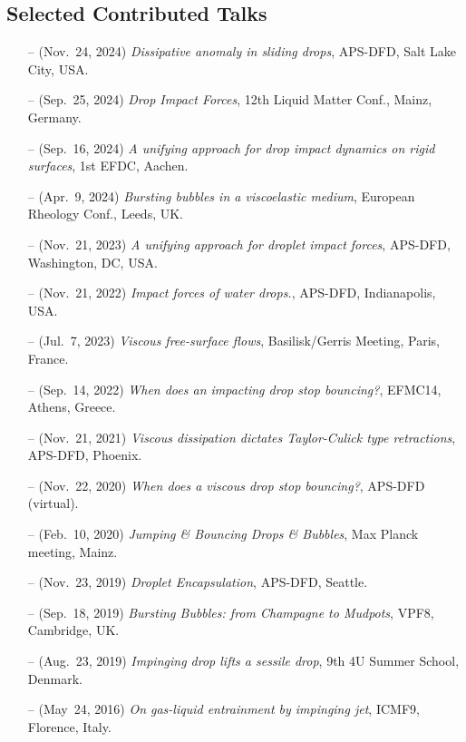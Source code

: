 \documentclass[10pt,a4paper,colorlinks,linkcolor=blue,urlcolor=blue,citecolor=blue]{moderncv}
\begin{document}
\subsection{Selected Contributed Talks}
\begin{itemize}[leftmargin=1.25em]
\item[--] (Nov.~24, 2024) \emph{Dissipative anomaly in sliding drops}, APS-DFD, Salt Lake City, USA.
\item[--] (Sep.~25, 2024) \emph{Drop Impact Forces}, 12th Liquid Matter Conf., Mainz, Germany.
\item[--] (Sep.~16, 2024) \emph{A unifying approach for drop impact dynamics on rigid surfaces}, 1st EFDC, Aachen.
\item[--] (Apr.~9, 2024) \emph{Bursting bubbles in a viscoelastic medium}, European Rheology Conf., Leeds, UK.
\item[--] (Nov.~21, 2023) \emph{A unifying approach for droplet impact forces}, APS-DFD, Washington, DC, USA.
\item[--] (Nov.~21, 2022) \emph{Impact forces of water drops.}, APS-DFD, Indianapolis, USA.
\item[--] (Jul.~7, 2023) \emph{Viscous free-surface flows}, Basilisk/Gerris Meeting, Paris, France.
\item[--] (Sep.~14, 2022) \emph{When does an impacting drop stop bouncing?}, EFMC14, Athens, Greece.
\item[--] (Nov.~21, 2021) \emph{Viscous dissipation dictates Taylor-Culick type retractions}, APS-DFD, Phoenix.
\item[--] (Nov.~22, 2020) \emph{When does a viscous drop stop bouncing?}, APS-DFD (virtual).
\item[--] (Feb.~10, 2020) \emph{Jumping \& Bouncing Drops \& Bubbles}, Max Planck meeting, Mainz.
\item[--] (Nov.~23, 2019) \emph{Droplet Encapsulation}, APS-DFD, Seattle.
\item[--] (Sep.~18, 2019) \emph{Bursting Bubbles: from Champagne to Mudpots}, VPF8, Cambridge, UK.
\item[--] (Aug.~23, 2019) \emph{Impinging drop lifts a sessile drop}, 9th 4U Summer School, Denmark.
\item[--] (May~24, 2016) \emph{On gas-liquid entrainment by impinging jet}, ICMF9, Florence, Italy.
\end{itemize}

\end{document}
